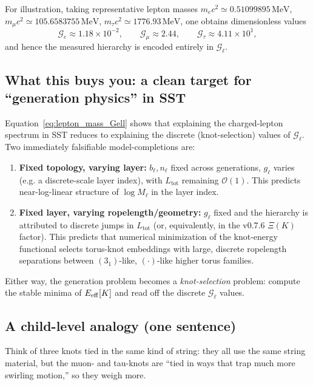 \documentclass[10pt]{article}
\begin{document}
        For illustration, taking representative lepton masses
        $m_e c^2\simeq 0.51099895\,\mathrm{MeV}$,
        $m_\mu c^2\simeq 105.6583755\,\mathrm{MeV}$,
        $m_\tau c^2\simeq 1776.93\,\mathrm{MeV}$,
        one obtains dimensionless values
        \begin{equation}
            \mathcal{G}_e \approx 1.18\times 10^{-2},\qquad
            \mathcal{G}_\mu \approx 2.44,\qquad
            \mathcal{G}_\tau \approx 4.11\times 10^{1},
            \label{eq:Gell_numbers}
        \end{equation}
        and hence the measured hierarchy is encoded entirely in $\mathcal{G}_\ell$.

    \subsection{What this buys you: a clean target for ``generation physics'' in SST}

        Equation~\eqref{eq:lepton_mass_Gell} shows that explaining the charged-lepton spectrum in SST reduces to
        explaining the discrete (knot-selection) values of $\mathcal{G}_\ell$.
        Two immediately falsifiable model-completions are:

        \begin{enumerate}
            \item \textbf{Fixed topology, varying layer:} $b_\ell,n_\ell$ fixed across generations, $g_\ell$ varies
            (e.g. a discrete-scale layer index), with $L_{\text{tot}}$ remaining $\mathcal O(1)$.
            This predicts near-log-linear structure of $\log M_\ell$ in the layer index.
            \item \textbf{Fixed layer, varying ropelength/geometry:} $g_\ell$ fixed and the hierarchy is attributed to
            discrete jumps in $L_{\text{tot}}$ (or, equivalently, in the v0.7.6 $\Xi(K)$ factor).
            This predicts that numerical minimization of the knot-energy functional selects torus-knot embeddings with
            large, discrete ropelength separations between $(3_1)$-like, $(\cdot)$-like higher torus families.
        \end{enumerate}

        Either way, the generation problem becomes a \emph{knot-selection} problem: compute the stable minima of
        $E_{\rm eff}[K]$ and read off the discrete $\mathcal{G}_\ell$ values.

    \subsection*{A child-level analogy (one sentence)}
        Think of three knots tied in the same kind of string: they all use the same string material, but the muon- and tau-knots
        are ``tied in ways that trap much more swirling motion,'' so they weigh more.
\end{document}
